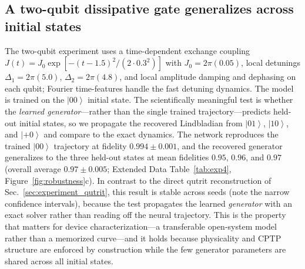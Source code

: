 \documentclass[11pt]{article}
\newcommand{\ket}[1]{\left\lvert #1 \right\rangle}
\begin{document}
\subsection{A two-qubit dissipative gate generalizes across initial states}
\label{sec:experiment_twoqubit}

The two-qubit experiment uses a time-dependent exchange coupling $J(t)=J_0\exp[-(t-1.5)^2/(2\cdot0.3^2)]$ with $J_0=2\pi(0.05)$, local detunings $\Delta_1=2\pi(5.0)$, $\Delta_2=2\pi(4.8)$, and local amplitude damping and dephasing on each qubit; Fourier time-features handle the fast detuning dynamics. The model is trained on the $\ket{00}$ initial state. The scientifically meaningful test is whether the \emph{learned generator}---rather than the single trained trajectory---predicts held-out initial states, so we propagate the recovered Lindbladian from $\ket{01}$, $\ket{10}$, and $\ket{+0}$ and compare to the exact dynamics. The network reproduces the trained $\ket{00}$ trajectory at fidelity $0.994\pm0.001$, and the recovered generator generalizes to the three held-out states at mean fidelities $0.95$, $0.96$, and $0.97$ (overall average $0.97\pm0.005$; Extended Data Table~\ref{tab:exp4}, Figure~\ref{fig:robustness}c). In contrast to the direct qutrit reconstruction of Sec.~\ref{sec:experiment_qutrit}, this result is stable across seeds (note the narrow confidence intervals), because the test propagates the learned \emph{generator} with an exact solver rather than reading off the neural trajectory. This is the property that matters for device characterization---a transferable open-system model rather than a memorized curve---and it holds because physicality and CPTP structure are enforced by construction while the few generator parameters are shared across all initial states.
\end{document}
